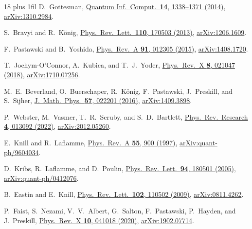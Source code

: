 \documentclass[aps,prl,reprint,notitlepage,nofootinbib,nobibnotes]{revtex4-2}
\begin{document}
\begin{thebibliography}{18}
\rightskip=0pt plus 1fil\relax
{}
D.~Gottesman,
\href{https://doi.org/10.26421/QIC14.15-16-5}
{Quantum Inf.\ Comput.\ \textbf{14}, 1338--1371 (2014)},
\href{https://arxiv.org/abs/1310.2984}{arXiv:1310.2984}.

S.~Bravyi and R.~K\"onig,
\href{https://doi.org/10.1103/PhysRevLett.110.170503}
{Phys.\ Rev.\ Lett.\ \textbf{110}, 170503 (2013)},
\href{https://arxiv.org/abs/1206.1609}{arXiv:1206.1609}.

F.~Pastawski and B.~Yoshida,
\href{https://doi.org/10.1103/PhysRevA.91.012305}
{Phys.\ Rev.\ A \textbf{91}, 012305 (2015)},
\href{https://arxiv.org/abs/1408.1720}{arXiv:1408.1720}.

T.~Jochym-O'Connor, A.~Kubica, and T.~J.~Yoder,
\href{https://doi.org/10.1103/PhysRevX.8.021047}
{Phys.\ Rev.\ X \textbf{8}, 021047 (2018)},
\href{https://arxiv.org/abs/1710.07256}{arXiv:1710.07256}.

M.~E.~Beverland, O.~Buerschaper, R.~K\"onig, F.~Pastawski,
J.~Preskill, and S.~Sijher,
\href{https://doi.org/10.1063/1.4939783}
{J.\ Math.\ Phys.\ \textbf{57}, 022201 (2016)},
\href{https://arxiv.org/abs/1409.3898}{arXiv:1409.3898}.

P.~Webster, M.~Vasmer, T.~R.~Scruby, and S.~D.~Bartlett,
\href{https://doi.org/10.1103/PhysRevResearch.4.013092}
{Phys.\ Rev.\ Research \textbf{4}, 013092 (2022)},
\href{https://arxiv.org/abs/2012.05260}{arXiv:2012.05260}.

E.~Knill and R.~Laflamme,
\href{https://doi.org/10.1103/PhysRevA.55.900}
{Phys.\ Rev.\ A \textbf{55}, 900 (1997)},
\href{https://arxiv.org/abs/quant-ph/9604034}{arXiv:quant-ph/9604034}.

D.~Kribs, R.~Laflamme, and D.~Poulin,
\href{https://doi.org/10.1103/PhysRevLett.94.180501}
{Phys.\ Rev.\ Lett.\ \textbf{94}, 180501 (2005)},
\href{https://arxiv.org/abs/quant-ph/0412076}{arXiv:quant-ph/0412076}.

B.~Eastin and E.~Knill,
\href{https://doi.org/10.1103/PhysRevLett.102.110502}
{Phys.\ Rev.\ Lett.\ \textbf{102}, 110502 (2009)},
\href{https://arxiv.org/abs/0811.4262}{arXiv:0811.4262}.

P.~Faist, S.~Nezami, V.~V.~Albert, G.~Salton, F.~Pastawski,
P.~Hayden, and J.~Preskill,
\href{https://doi.org/10.1103/PhysRevX.10.041018}
{Phys.\ Rev.\ X \textbf{10}, 041018 (2020)},
\href{https://arxiv.org/abs/1902.07714}{arXiv:1902.07714}.


\end{thebibliography}
\end{document}
